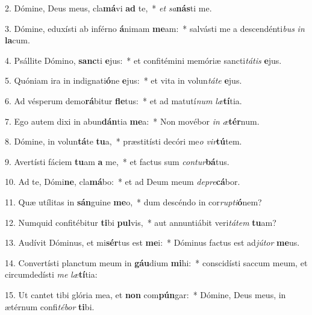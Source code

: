 2. Dómine, Deus meus, cla\textbf{má}vi \textbf{ad} te,~*  \textit{et} \textit{sa}\textbf{nás}ti me.\

3. Dómine, eduxísti ab inférno \textbf{á}nimam \textbf{me}am:~*  salvásti me a descendénti\textit{bus} \textit{in} \textbf{la}cum.\

4. Psállite Dómino, \textbf{sanc}ti \textbf{e}jus:~*  et confitémini memóriæ sancti\textit{tá}\textit{tis} \textbf{e}jus.\

5. Quóniam ira in indignati\textbf{ó}ne \textbf{e}jus:~*  et vita in volun\textit{tá}\textit{te} \textbf{e}jus.\

6. Ad vésperum demo\textbf{rá}bitur \textbf{fle}tus:~*  et ad matutí\textit{num} \textit{læ}\textbf{tí}tia.\

7. Ego autem dixi in abun\textbf{dán}tia \textbf{me}a:~*  Non movébor \textit{in} \textit{æ}\textbf{tér}num.\

8. Dómine, in volun\textbf{tá}te \textbf{tu}a,~*  præstitísti decóri me\textit{o} \textit{vir}\textbf{tú}tem.\

9. Avertísti fáciem \textbf{tu}am \textbf{a} me,~*  et factus sum \textit{con}\textit{tur}\textbf{bá}tus.\

10. Ad te, Dómi\textbf{ne}, cla\textbf{má}bo:~*  et ad Deum meum \textit{de}\textit{pre}\textbf{cá}bor.\

11. Quæ utílitas in \textbf{sán}guine \textbf{me}o,~*  dum descéndo in cor\textit{rup}\textit{ti}\textbf{ó}nem?\

12. Numquid confitébitur \textbf{ti}bi \textbf{pul}vis,~*  aut annuntiábit veri\textit{tá}\textit{tem} \textbf{tu}am?\

13. Audívit Dóminus, et mi\textbf{sér}tus est \textbf{me}i:~*  Dóminus factus est ad\textit{jú}\textit{tor} \textbf{me}us.\

14. Convertísti planctum meum in \textbf{gáu}dium \textbf{mi}hi:~*  conscidísti saccum meum, et circumdedísti \textit{me} \textit{læ}\textbf{tí}tia:\

15. Ut cantet tibi glória mea, et \textbf{non} com\textbf{pún}gar:~*  Dómine, Deus meus, in ætérnum confi\textit{té}\textit{bor} \textbf{ti}bi.\

